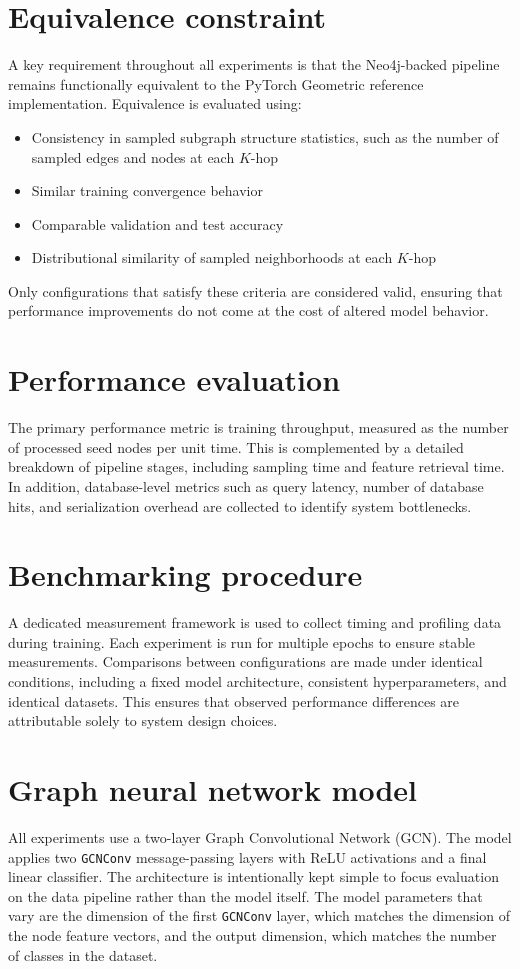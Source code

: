 \documentclass[PhD,single]{uclathes}
\begin{document}
\section{Equivalence constraint}
A key requirement throughout all experiments is that the Neo4j-backed pipeline
remains functionally equivalent to the PyTorch Geometric reference
implementation. Equivalence is evaluated using:

\begin{itemize}
    \item Consistency in sampled subgraph structure statistics, such as the number of sampled edges and nodes at each $K$-hop
    \item Similar training convergence behavior
    \item Comparable validation and test accuracy
    \item Distributional similarity of sampled neighborhoods at each $K$-hop
\end{itemize}

Only configurations that satisfy these criteria are considered valid, ensuring
that performance improvements do not come at the cost of altered model
behavior.

\section{Performance evaluation}
The primary performance metric is training throughput, measured as the number
of processed seed nodes per unit time. This is complemented by a detailed
breakdown of pipeline stages, including sampling time and feature retrieval
time. In addition, database-level metrics such as query latency, number of
database hits, and serialization overhead are collected to identify system
bottlenecks.

\section{Benchmarking procedure}
A dedicated measurement framework is used to collect timing and profiling data
during training. Each experiment is run for multiple epochs to ensure stable
measurements. Comparisons between configurations are made under identical
conditions, including a fixed model architecture, consistent hyperparameters,
and identical datasets. This ensures that observed performance differences are
attributable solely to system design choices.

\section{Graph neural network model}\label{sec:model}
All experiments use a two-layer Graph Convolutional Network (GCN). The model
applies two \texttt{GCNConv} message-passing layers with ReLU activations and a
final linear classifier. The architecture is intentionally kept simple to focus
evaluation on the data pipeline rather than the model itself. The model
parameters that vary are the dimension of the first \texttt{GCNConv} layer,
which matches the dimension of the node feature vectors, and the output
dimension, which matches the number of classes in the dataset.
\end{document}
